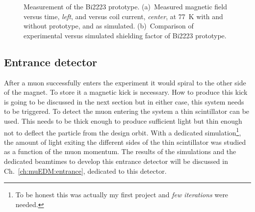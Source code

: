 \begin{refsection}
\begin{figure}
    \centering
		\hfill
    \caption{Measurement of the Bi2223 prototype. (a)~Measured magnetic field versus time, {\it left}, and versus coil current, {\it center}, at \SI{77}{K} with and without prototype, and as simulated. (b)~Comparison of experimental versus simulated shielding factor of Bi2223 prototype.}
    \label{fig:Bi2223}
\end{figure}

    \subsection{Entrance detector} 
        After a muon successfully enters the experiment it would spiral to the other side of the magnet. 
        To store it a magnetic kick is necessary. 
        How to produce this kick is going to be discussed in the next section but in either case, this system needs to be triggered.
        To detect the muon entering the system a thin scintillator can be used.
        This needs to be thick enough to produce sufficient light but thin enough not to deflect the particle from the design orbit.
        With a dedicated \gf simulation\footnote{To be honest this was actually my first \gf project and \textit{few iterations} were needed.}, the amount of light exiting the different sides of the thin scintillator was studied as a function of the muon momentum. 
        The results of the simulations and the dedicated beamtimes to develop this entrance detector will be discussed in Ch.~\ref{ch:muEDM:entrance}, dedicated to this detector.


\end{refsection}
